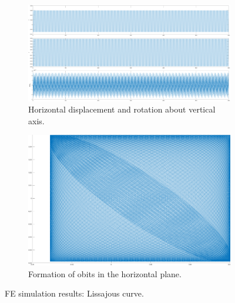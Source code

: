 \documentclass{article}
\begin{document}
\begin{figure}
\centering
    \begin{subfigure}[b]{0.45\textwidth}
        \centering
        \includegraphics[width=\textwidth]{figures/FEA_simu_Lissa_Displacement.png}
        \caption{\small{Horizontal displacement and rotation about vertical axis.}}
        \label{fig:fea:lissa_displ}
    \end{subfigure}
    \begin{subfigure}[b]{0.45\textwidth}
        \centering
        \includegraphics[width=\textwidth]{figures/FEA_simu_Lissa_Orbits.png}
        \caption{\small{Formation of obits in the horizontal plane.}}
        \label{fig:fea:lissa_orbits}
    \end{subfigure}
\caption{FE simulation results: Lissajous curve.}
    \label{fig:fea:lissa_simu_results}
\end{figure}
\end{document}
